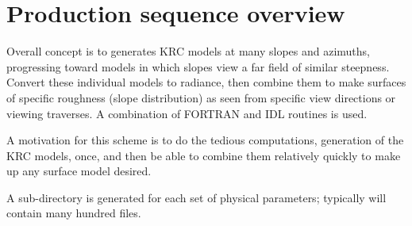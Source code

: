 \documentclass{article}
\begin{document}
\section{Production sequence overview} %
Overall concept is to generates KRC models at many slopes and azimuths,
progressing toward models in which slopes view a far field of similar
steepness. Convert these individual models to radiance, then combine them to
make surfaces of specific roughness (slope distribution) as seen from specific
view directions or viewing traverses. A combination of FORTRAN and IDL routines is used.

A motivation for this scheme is to do the tedious computations, generation of the KRC models, once, and then be able to combine them relatively quickly to make up any surface model desired.

A sub-directory is generated for each set of physical parameters; typically will contain many hundred files. 
\end{document}
